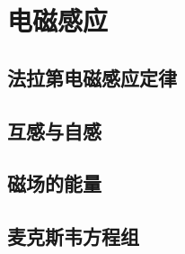 \chapter{电磁感应}
\setcounter{example_counter}{1}

\section{法拉第电磁感应定律}

\section{互感与自感}

\section{磁场的能量}

\section{麦克斯韦方程组}